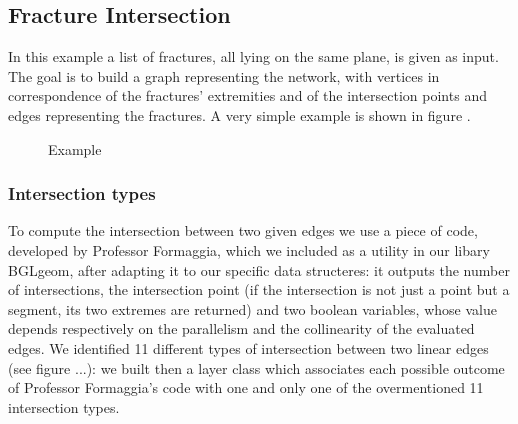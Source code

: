 \documentclass[11pt]{article} %
\begin{document}
	\subsection{Fracture Intersection}
	In this example a list of fractures, all lying on the same plane, is given as input. The goal is to build a graph representing the network, with vertices in correspondence of the fractures' extremities and of the intersection points  and edges representing the fractures. A very simple example is shown in figure \label{fig:frac_int}.
	\begin{figure}
		\centering 
		\caption{Example}
		\label{fig:frac_int}
	\end{figure}
	
		\subsubsection{Intersection types}
		To compute the intersection between two given edges we use a piece of code, developed by Professor Formaggia, which we included as a utility in our libary BGLgeom, after adapting it to our specific data structeres: it outputs the number of intersections, the intersection point (if the intersection is not just a point but a segment, its two extremes are returned) and two boolean variables, whose value depends respectively on the parallelism and the collinearity of the evaluated edges. \newline
		We identified 11 different types of intersection between two linear edges (see figure ...): we built then a layer class which associates each possible outcome of Professor Formaggia's code with one and only one of the overmentioned 11 intersection types. \newline
			
		
\end{document}
